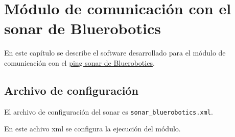 \chapter{Módulo de comunicación con el sonar de Bluerobotics}
En este capítulo se describe el software desarrollado para el módulo de comunicación con el \href{https://bluerobotics.com/store/sensors-sonars-cameras/sonar/ping-sonar-r2-rp/}{ping sonar de Bluerobotics}.

\section{Archivo de configuración}\label{sec:1}

El archivo de configuración del sonar es \texttt{sonar\_bluerobotics.xml}. 

En este achivo xml se configura la ejecución del módulo. 
